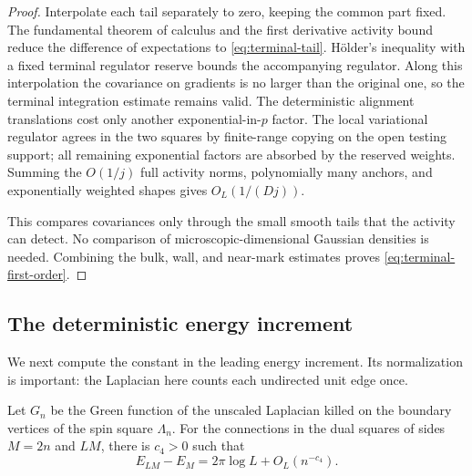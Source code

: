 \begin{proof}
Interpolate each tail separately to zero, keeping the common part
fixed.  The fundamental theorem of calculus and the first derivative
activity bound reduce the difference of expectations to
\eqref{eq:terminal-tail}.  H\"older's inequality with a fixed terminal
regulator reserve bounds the accompanying regulator.  Along this
interpolation the covariance on gradients is no larger than the
original one, so the terminal integration estimate remains valid.
The deterministic alignment translations cost only another
exponential-in-$p$ factor.  The local variational regulator agrees in
the two squares by finite-range copying on the open testing support;
all remaining exponential factors are absorbed by the reserved
weights.  Summing the $O(1/j)$ full activity norms, polynomially many
anchors, and exponentially weighted shapes gives $O_L(1/(Dj))$.

This compares covariances only through the small smooth tails that the
activity can detect.  No comparison of microscopic-dimensional
Gaussian densities is needed.  Combining the bulk, wall, and
near-mark estimates proves \eqref{eq:terminal-first-order}.
\end{proof}

\subsection{The deterministic energy increment}

We next compute the constant in the leading energy increment.  Its
normalization is important: the Laplacian here counts each undirected
unit edge once.

\begin{lemma}
\label{lem:terminal-green}
Let $G_n$ be the Green function of the unscaled Laplacian killed on
the boundary vertices of the spin square $\Lambda_n$.  For the
connections in the dual squares of sides $M=2n$ and $LM$, there is
$c_4>0$ such that
\begin{equation}
 E_{LM}-E_M
  =2\pi\log L+O_L(n^{-c_4}).
 \label{eq:terminal-energy}
\end{equation}
\end{lemma}

